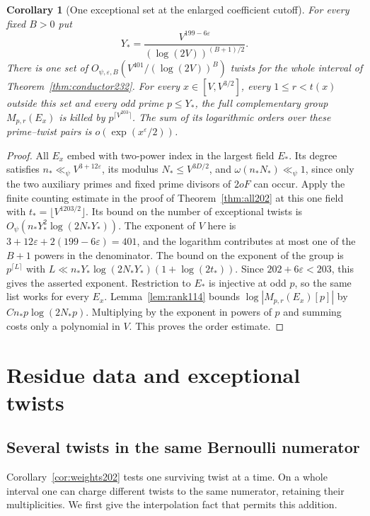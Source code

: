 \documentclass[a4paper,11pt]{article}
\newtheorem{corollary}[proposition]{Corollary}
\theoremstyle{definition}
\theoremstyle{remark}
\numberwithin{equation}{section}
\begin{document}
\begin{corollary}[One exceptional set at the enlarged coefficient cutoff]
\label{cor:cut232}
For every fixed \(B>0\) put
\[
 Y_* = \frac{V^{199-6\varepsilon}}
                    {(\log(2V))^{(B+1)/2}} .
\]
There is one set of \(O_{\psi,\varepsilon,B}(V^{401}/(\log(2V))^B)\)
twists for the whole interval of Theorem~\ref{thm:conductor232}.
For every \(x\in[V,V^{3/2}]\), every \(1\le r<t(x)\) outside this
set and every odd prime \(p\le Y_*\), the full complementary group
\(M_{p,r}(E_x)\) is killed by \(p^{\lceil V^{203}\rceil}\).
The sum of its logarithmic orders over these prime--twist pairs
is \(o(\exp(x^\varepsilon/2))\).
\end{corollary}
\begin{proof}
All \(E_x\) embed with two-power index in the largest field
\(E_*\). Its degree satisfies \(n_*\ll_\psi V^{3+12\varepsilon}\),
its modulus \(N_*\le V^{3D/2}\), and \(\omega(n_*N_*)\ll_\psi1\),
since only the two auxiliary primes and fixed prime divisors of
\(2oF\) can occur. Apply the finite counting estimate in the proof
of Theorem~\ref{thm:all202} at this one field with
\(t_*=\lfloor V^{1203/2}\rfloor\). Its bound on the number of
exceptional twists is \(O_\psi(n_*Y_*^2\log(2N_*Y_*))\).
The exponent of \(V\) here is \(3+12\varepsilon+
2(199-6\varepsilon)=401\), and the logarithm contributes at
most one of the \(B+1\) powers in the denominator.
The bound on the exponent of the group is
\(p^{\lceil L\rceil}\) with
\(L\ll n_*Y_*\log(2N_*Y_*)(1+\log(2t_*))\).
Since \(202+6\varepsilon<203\), this gives the asserted exponent.
Restriction to \(E_*\) is injective at odd \(p\), so the same
list works for every \(E_x\). Lemma~\ref{lem:rank114} bounds
\(\log|M_{p,r}(E_x)[p]|\) by \(C n_*p\log(2N_*p)\).
Multiplying by the exponent in powers of \(p\) and summing costs
only a polynomial in \(V\). This proves the order estimate.
\end{proof}

\section{Residue data and exceptional twists}\label{nav:g-II-3}

\subsection{Several twists in the same Bernoulli numerator}\label{nav:II-38}
Corollary~\ref{cor:weights202} tests one surviving twist at a time.
On a whole interval one can charge different twists to the same
numerator, retaining their multiplicities. We first give the
interpolation fact that permits this addition.
\end{document}
